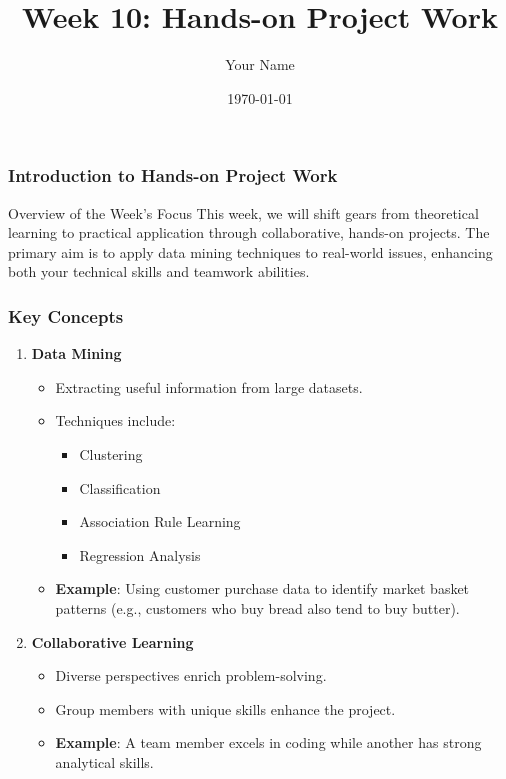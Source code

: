 \documentclass{beamer}
\title{Week 10: Hands-on Project Work}
\author{Your Name}
\institute{Your Institution}
\date{\today}
\begin{document}
\frame{\titlepage}

\begin{frame}[fragile]
    \frametitle{Introduction to Hands-on Project Work}
    \begin{block}{Overview of the Week's Focus}
        This week, we will shift gears from theoretical learning to practical application through collaborative, hands-on projects. The primary aim is to apply data mining techniques to real-world issues, enhancing both your technical skills and teamwork abilities.
    \end{block}
\end{frame}

\begin{frame}[fragile]
    \frametitle{Key Concepts}
    \begin{enumerate}
        \item \textbf{Data Mining}
        \begin{itemize}
            \item Extracting useful information from large datasets.
            \item Techniques include:
            \begin{itemize}
                \item Clustering
                \item Classification
                \item Association Rule Learning
                \item Regression Analysis
            \end{itemize}
            \item \textbf{Example}: Using customer purchase data to identify market basket patterns (e.g., customers who buy bread also tend to buy butter).
        \end{itemize}

        \item \textbf{Collaborative Learning}
        \begin{itemize}
            \item Diverse perspectives enrich problem-solving.
            \item Group members with unique skills enhance the project.
            \item \textbf{Example}: A team member excels in coding while another has strong analytical skills.
        \end{itemize}
    \end{enumerate}
\end{frame}
\end{document}
